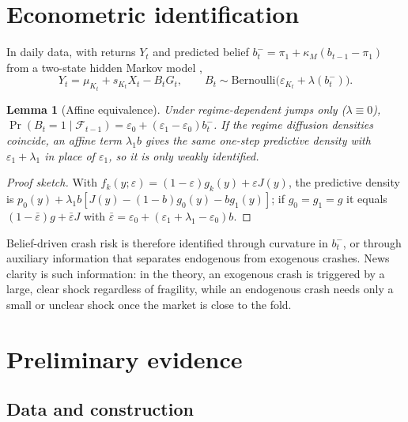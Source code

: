 \documentclass[11pt,a4paper]{article}
\newtheorem{lemma}{Lemma}
\theoremstyle{remark}
\begin{document}
\section{Econometric identification}

In daily data, with returns $Y_t$ and predicted belief
$b^-_t=\pi_1+\kappa_M(b_{t-1}-\pi_1)$ from a two-state hidden Markov model
\citep{Hamilton1989},
\begin{equation}
Y_t=\mu_{K_t}+s_{K_t}X_t-B_tG_t,\qquad B_t\sim\mathrm{Bernoulli}\big(\varepsilon_{K_t}+\lambda(b^-_t)\big).
\end{equation}

\begin{lemma}[Affine equivalence]\label{lem:affine}
Under regime-dependent jumps only ($\lambda\equiv0$),
$\Pr(B_t=1\mid\mathcal F_{t-1})=\varepsilon_0+(\varepsilon_1-\varepsilon_0)b^-_t$. If the
regime diffusion densities coincide, an affine term $\lambda_1b$ gives the same one-step
predictive density with $\varepsilon_1+\lambda_1$ in place of $\varepsilon_1$, so it is only
weakly identified.
\end{lemma}
\begin{proof}[Proof sketch]
With $f_k(y;\varepsilon)=(1-\varepsilon)g_k(y)+\varepsilon J(y)$, the predictive density is
$p_0(y)+\lambda_1b[J(y)-(1-b)g_0(y)-bg_1(y)]$; if $g_0=g_1=g$ it equals
$(1-\bar\varepsilon)g+\bar\varepsilon J$ with
$\bar\varepsilon=\varepsilon_0+(\varepsilon_1+\lambda_1-\varepsilon_0)b$.
\end{proof}

\noindent Belief-driven crash risk is therefore identified through curvature in $b^-_t$, or
through auxiliary information that separates endogenous from exogenous crashes. News
clarity is such information: in the theory, an exogenous crash is triggered by a large,
clear shock regardless of fragility, while an endogenous crash needs only a small or unclear
shock once the market is close to the fold.

\section{Preliminary evidence}\label{sec:evidence}

\subsection{Data and construction}
\end{document}
